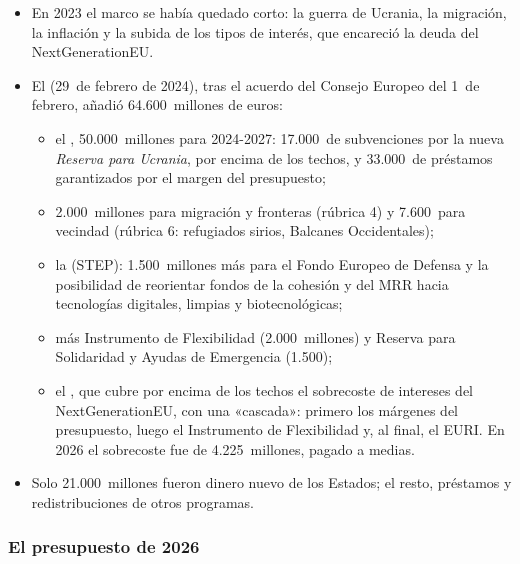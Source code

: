 \documentclass[11pt]{article}
\begin{document}
\begin{itemize}
\item En 2023 el marco se había quedado corto: la guerra de Ucrania, la migración, la inflación y la subida de los tipos de interés, que encareció la deuda del NextGenerationEU.
\item El  (29~de febrero de 2024), tras el acuerdo del Consejo Europeo del 1~de febrero, añadió 64.600~millones de euros\nocite{UE2024RevisionMFP,PE2026FichaMFP}:
  \begin{itemize}
  \item el , 50.000~millones para 2024-2027: 17.000~de subvenciones por la nueva \emph{Reserva para Ucrania}, por encima de los techos, y 33.000~de préstamos garantizados por el margen del presupuesto;
  \item 2.000~millones para migración y fronteras (rúbrica 4) y 7.600~para vecindad (rúbrica 6: refugiados sirios, Balcanes Occidentales);
  \item la  (STEP): 1.500~millones más para el Fondo Europeo de Defensa y la posibilidad de reorientar fondos de la cohesión y del MRR hacia tecnologías digitales, limpias y biotecnológicas;
  \item más Instrumento de Flexibilidad (2.000~millones) y Reserva para Solidaridad y Ayudas de Emergencia (1.500);
  \item el , que cubre por encima de los techos el sobrecoste de intereses del NextGenerationEU, con una «cascada»: primero los márgenes del presupuesto, luego el Instrumento de Flexibilidad y, al final, el EURI. En 2026 el sobrecoste fue de 4.225~millones, pagado a medias\nocite{PE2025Presupuesto2026}.
  \end{itemize}
\item Solo 21.000~millones fueron dinero nuevo de los Estados; el resto, préstamos y redistribuciones de otros programas.
\end{itemize}

\subsubsection{El presupuesto de 2026}\label{sec:presupuesto-2026}
\end{document}
